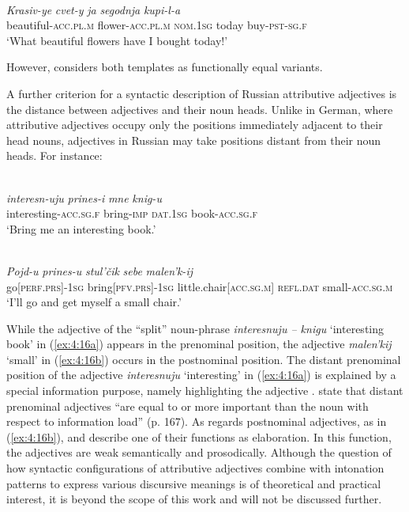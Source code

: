 \ea
\label{ex:4:15}
\citep[153]{zemskaja}\\
\gll \textit{Krasiv-ye} \textit{cvet-y} \textit{ja} \textit{segodnja} \textit{kupi-l-a}\\
	beautiful-\textsc{acc.pl.m} flower-\textsc{acc.pl.m} \textsc{nom.1sg} today buy-\textsc{pst-sg.f}\\
\glt `What beautiful flowers have I bought today!'
\z

\noindent However, \citet[208, 211, 221--222]{lapteva} considers both templates as functionally equal variants.

A further criterion for a syntactic description of Russian attributive adjectives is the distance between adjectives and their noun heads. Unlike in German, where attributive adjectives occupy only the positions immediately adjacent to their head nouns, adjectives in Russian may take positions distant from their noun heads. For instance:

\ea
\ea{\label{ex:4:16a}}
\citep[165]{miller-weinert}\\
\gll \textit{interesn-uju} \textit{prines-i} \textit{mne} \textit{knig-u}\\
	interesting-\textsc{acc.sg.f} bring-\textsc{imp} \textsc{dat.1sg} book-\textsc{acc.sg.f}\\
\glt `Bring me an interesting book.'

\ex
\label{ex:4:16b}
\citep[213]{lapteva}\\
\gll \textit{Pojd-u} \textit{prines-u} \textit{stul'čik} \textit{sebe} \textit{malen'k-ij}\\
	go[\textsc{perf.prs}]-\textsc{1sg} bring[\textsc{pfv.prs}]-\textsc{1sg} little.chair[\textsc{acc.sg.m}] \textsc{refl.dat} small-\textsc{acc.sg.m}\\
\glt `I'll go and get myself a small chair.'
\z
\z

\noindent While the adjective of the “split” noun-phrase \textit{interesnuju -- knigu} `interesting book' in (\ref{ex:4:16a}) appears in the prenominal position, the adjective \textit{malen'kij} `small' in (\ref{ex:4:16b}) occurs in the postnominal position. The distant prenominal position of the adjective \textit{interesnuju} `interesting' in (\ref{ex:4:16a}) is explained by a special information purpose, namely highlighting the adjective \citep[153]{zemskaja}. \citet{miller-weinert} state that distant prenominal adjectives ``are equal to or more important than the noun with respect to information load'' (p. 167). As regards postnominal adjectives, as in (\ref{ex:4:16b}), \citet[213]{lapteva}  and \citet[153]{zemskaja} describe one of their functions as elaboration. In this function, the adjectives are weak semantically and prosodically. Although the question of how syntactic configurations of attributive adjectives combine with intonation patterns to express various discursive meanings is of theoretical and practical interest, it is beyond the scope of this work and will not be discussed further.

